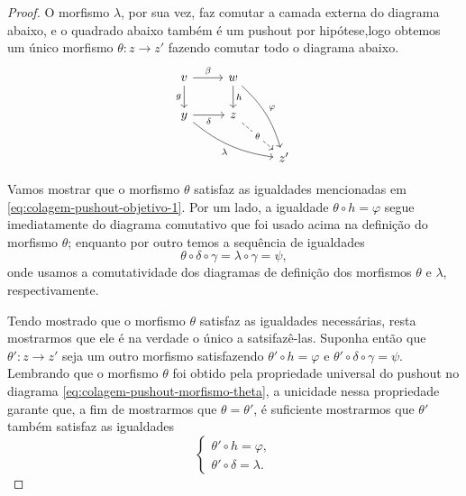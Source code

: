\begin{proof}
   O morfismo $\lambda$, por sua vez, faz comutar a camada externa do diagrama abaixo, e o quadrado abaixo também é um pushout por hipótese,logo obtemos um único morfismo $\theta: z \to z'$ fazendo comutar todo o diagrama abaixo.
   \begin{equation}\label{eq:colagem-pushout-morfismo-theta}
     \begin{tikzcd}
       v
       \arrow[r, "\beta"]
       \arrow[d, "g" swap]
       & w
       \arrow[rdd, bend left=15, "\varphi"]
       \arrow[d, "h"]
       \\ y
       \arrow[r, "\delta" swap]
       \arrow[rrd, bend right=15, "\lambda" swap]
       & z
       \arrow[rd, dashed, "\theta" description]
       \\ & & z'
     \end{tikzcd}
   \end{equation}

   Vamos mostrar que o morfismo $\theta$ satisfaz as igualdades mencionadas em \eqref{eq:colagem-pushout-objetivo-1}.
   Por um lado, a igualdade $\theta \circ h = \varphi$ segue imediatamente do diagrama comutativo que foi usado acima na definição do morfismo $\theta$; enquanto por outro temos a sequência de igualdades
   \begin{displaymath}
     \theta \circ \delta \circ \gamma = \lambda \circ \gamma = \psi,
   \end{displaymath}
   onde usamos a comutatividade dos diagramas de definição dos morfismos $\theta$ e $\lambda$, respectivamente.

   Tendo mostrado que o morfismo $\theta$ satisfaz as igualdades necessárias, resta mostrarmos que ele é na verdade o único a satsifazê-las.
   Suponha então que $\theta': z \to z'$ seja um outro morfismo satisfazendo $\theta' \circ h = \varphi$ e $\theta' \circ \delta \circ \gamma = \psi$.
   Lembrando que o morfismo $\theta$ foi obtido pela propriedade universal do pushout no diagrama \eqref{eq:colagem-pushout-morfismo-theta}, a unicidade nessa propriedade garante que, a fim de mostrarmos que $\theta = \theta'$, é suficiente mostrarmos que $\theta'$ também satisfaz as igualdades
   \begin{displaymath}
     \begin{cases}
       \theta' \circ h = \varphi, \\
       \theta' \circ \delta = \lambda.
     \end{cases}
   \end{displaymath}
 \end{proof}

